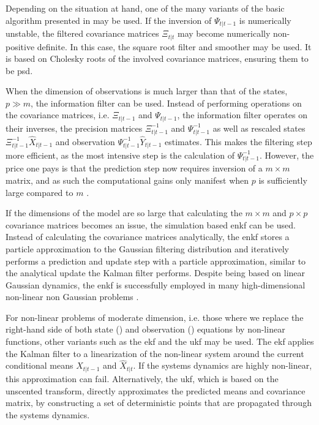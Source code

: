 Depending on the situation at hand, one of the many variants of the basic algorithm presented in  may be used. If the inversion of $\Psi_{t|t-1}$ is numerically unstable, the filtered covariance matrices $\Xi_{t|t}$ may become numerically non-positive definite. In this case, the square root filter and smoother \citep{Morf1975Squareroot} may be used. It is based on Cholesky roots of the involved covariance matrices, ensuring them to be \acrshort{psd}.

When the dimension of observations is much larger than that of the states, $p \gg m$, the information filter \citep{Fraser1969Optimum} can be used. Instead of performing operations on the covariance matrices, i.e. $\Xi_{t|t-1}$ and $\Psi_{t|t-1}$, the information filter operates on their inverses, the precision matrices $\Xi_{t|t - 1}^{-1}$ and $\Psi_{t|t-1}^{-1}$ as well as rescaled states $\Xi_{t | t - 1}^{-1}
\hat X_{t | t - 1}$ and observation $\Psi_{t | t-1}^{-1}\hat Y_{t|t -1}$ estimates. This makes the filtering step more efficient, as the most intensive step is the calculation of $\Psi_{t | t- 1}^{-1}$. However, the price one pays is that the prediction step now requires inversion of a $m\times m$ matrix, and as such the computational gains only manifest when $p$ is sufficiently large compared to $m$ \citep{Assimakis2012Information}.

If the dimensions of the model are so large that calculating the $m\times m$ and $p\times p$ covariance matrices becomes an issue, the simulation based \acrfull{enkf} \citep{Evensen1994Sequential} can be used. Instead of calculating the covariance matrices analytically, the \acrshort{enkf} stores a particle approximation to the Gaussian filtering distribution and iteratively performs a prediction and update step with a particle approximation, similar to the analytical update the Kalman filter performs. Despite being based on linear Gaussian dynamics, the \acrshort{enkf} is successfully employed in many high-dimensional non-linear non Gaussian problems \citep{Katzfuss2016Understanding}. 

For non-linear problems of moderate dimension, i.e. those where we replace the right-hand side of both state () and observation () equations by non-linear functions, other variants such as the \acrfull{ekf} \citep{Jazwinski1970Stochastic} and the \acrfull{ukf} \citep{Julier1997New} may be used. The \acrshort{ekf} applies the Kalman filter to a linearization of the non-linear system around the current conditional means $\hat X_{t| t-1}$ and $\hat X_{t|t}$. If the systems dynamics are highly non-linear, this approximation can fail. Alternatively, the \acrshort{ukf}, which is based on the unscented transform, directly approximates the predicted means and covariance matrix, by constructing a set of deterministic points that are propagated through the systems dynamics.

